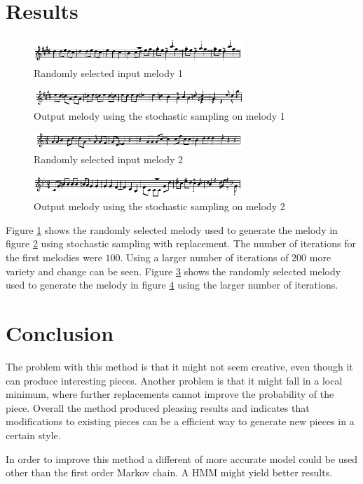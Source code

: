 \section{Results}
\begin{figure}[h!]
\centerline{\includegraphics[width=300px]{../images/swr_in.pdf}}
\caption{Randomly selected input melody 1}
\label{ims:swr_in}
\end{figure}

\begin{figure}[h!]
\centerline{\includegraphics[width=300px]{../images/swr_out.pdf}}
\caption{Output melody using the stochastic sampling on melody 1}
\label{ims:swr_out}
\end{figure}

\begin{figure}[h!]
\centerline{\includegraphics[width=300px]{../images/swr_in2.pdf}}
\caption{Randomly selected input melody 2}
\label{ims:swr_in2}
\end{figure}

\begin{figure}[h!]
\centerline{\includegraphics[width=300px]{../images/swr_out2.pdf}}
\caption{Output melody using the stochastic sampling on melody 2}
\label{ims:swr_out2}
\end{figure}

Figure \ref{ims:swr_in} shows the randomly selected melody used to generate the melody in figure \ref{ims:swr_out} using stochastic sampling with replacement. The number of iterations for the first melodies were $100$.
Using a larger number of iterations of $200$ more variety and change can be seen. Figure \ref{ims:swr_in2} shows the randomly selected melody used to generate the melody in figure \ref{ims:swr_out2} using the larger number of iterations.


\section{Conclusion}
The problem with this method is that it might not seem creative, even though it can produce interesting pieces. Another problem is that it might fall in a local minimum, where further replacements cannot improve the probability of the piece. 
Overall the method produced pleasing results and indicates that modifications to existing pieces can be a efficient way to generate new pieces in a certain style.

In order to improve this method a different of more accurate model could be used other than the first order Markov chain. A \ac{HMM} might yield better results.